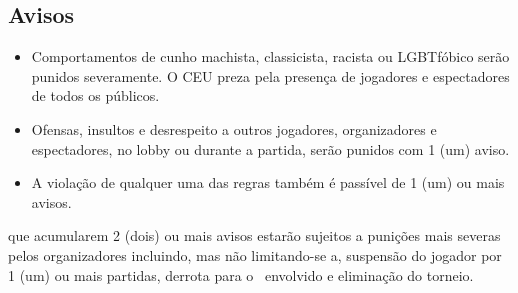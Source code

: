 \subsection{Avisos}

\begin{itemize}
    \item Comportamentos de cunho machista, classicista, racista ou LGBTfóbico serão punidos severamente. O CEU preza pela presença de jogadores e espectadores de todos os públicos.
    \item Ofensas, insultos e desrespeito a outros jogadores, organizadores e espectadores, no lobby ou durante a partida, serão punidos com 1 (um) aviso.
    \item A violação de qualquer uma das regras também é passível de 1 (um) ou mais avisos.
\end{itemize}

\CapBasicUnitPl que acumularem 2 (dois) ou mais avisos estarão sujeitos a punições mais severas pelos organizadores incluindo, mas não limitando-se a, suspensão do jogador por 1 (um) ou mais partidas, derrota para o \BasicUnit\ envolvido e eliminação do torneio.